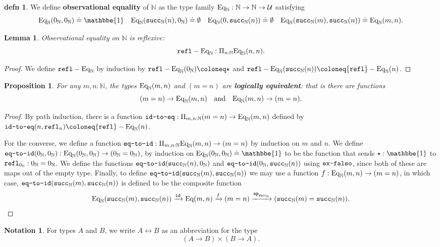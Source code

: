 \documentclass{amsart}
\theoremstyle{theorem}
\newtheorem*{lem}{Lemma}
\newtheorem*{prop}{Proposition}
\theoremstyle{definition}
\newtheorem*{defn}{defn}
\newtheorem*{ntn}{Notation}
\theoremstyle{remark}
\newcommand{\0}{\mathbbe{0}}
\newcommand{\1}{\mathbbe{1}}
\newcommand{\2}{\mathbbe{2}}
\newcommand{\3}{\mathbbe{3}}
\newcommand{\4}{\mathbbe{4}}
\newcommand{\term}[1]{{\textup{\texttt{#1}}}}
\newcommand{\id}{\term{id}}
\newcommand{\bN}{{\mathbb{N}}}
\newcommand{\suc}{\term{succ}_{\bN}}
\newcommand{\refl}{\term{refl}}
\newcommand{\ap}{\term{ap}}
\newcommand{\UU}{{\mathcal{U}}}
\newcommand{\Eq}{\textup{\text{Eq}}}
\begin{document}
\begin{defn} We define \textbf{observational equality} of $\bN$ as the type family $\Eq_\bN : \bN \to \bN \to \UU$ satisfying
\[ \Eq_\bN(0_\bN,0_\bN) \doteq \1 \quad \Eq_\bN(\suc(n),0_\bN) \doteq \emptyset \quad \Eq_\bN(0,\suc(n)) \doteq \emptyset \quad \Eq_\bN(\suc(m), \suc(n)) \doteq \Eq_\bN(m,n).\]
\end{defn}

\begin{lem} Observational equality on $\bN$ is reflexive:
\[ \refl-\Eq_\bN : \Pi_{n : \bN} \Eq_\bN(n,n).\]
\end{lem}
\begin{proof}
We define $\refl-\Eq_\bN$ by induction by $\refl-\Eq_\bN(0_\bN) \coloneq \star$ and $\refl-\Eq_\bN(\suc(n)) \coloneq \refl-\Eq_\bN(n)$.
\end{proof}

\begin{prop} For any $m,n : \bN$, the types $\Eq_\bN(m,n)$ and $(m=n)$ are \textbf{logically equivalent}: that is there are functions
\[ (m = n) \to \Eq_\bN(m,n) \quad \text{and} \quad \Eq_\bN(m,n) \to (m=n).\]
\end{prop}
\begin{proof}
By path induction, there is a function $\term{id-to-eq} : \Pi_{m,n: \bN} (m =n) \to \Eq_\bN(m,n)$ defined by $\term{id-to-eq}(n,\refl_n) \coloneq \refl-\Eq_\bN(n)$. 

For the converse, we define a function $\term{eq-to-id} : \Pi_{m,n : \bN} \Eq_\bN(m,n) \to (m=n)$ by induction on $m$ and $n$. We define $\term{eq-to-id}(0_\bN,0_\bN) : \Eq_\bN(0_\bN,0_\bN) \to (0_\bN = 0_\bN)$, by induction on $\Eq_\bN(0_\bN,0_\bN) \doteq \1$ to be the function that sends $\star : \1$ to $\refl_{0_\bN} : 0_\bN = 0_\bN$. We define the functions $\term{eq-to-id}(\suc(n),0_\bN)$ and $\term{eq-to-id}(0_\bN,\suc(n))$ using $\term{ex-falso}$, since both of these are maps out of the empty type. Finally, to define $\term{eq-to-id}(\suc(m),\suc(n))$ we may use a function $f : \Eq_\bN(m,n) \to (m=n)$, in which case, $\term{eq-to-id}(\suc(m),\suc(n))$  is defined to be the composite function
\[ \Eq_\bN(\suc(m),\suc(n)) \xrightarrow{\id} \Eq(m,n) \xrightarrow{f} (m=n) \xrightarrow{\ap_{\suc}} (\suc(m)=\suc(n)).\]
\end{proof}

\begin{ntn} For types $A$ and $B$, we write $A \leftrightarrow B$ as an abbreviation for the type
\[ (A \to B) \times (B \to A).\]
\end{ntn}
\end{document}
